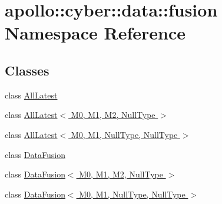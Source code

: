 \hypertarget{namespaceapollo_1_1cyber_1_1data_1_1fusion}{\section{apollo\-:\-:cyber\-:\-:data\-:\-:fusion Namespace Reference}
\label{namespaceapollo_1_1cyber_1_1data_1_1fusion}
}
\subsection*{Classes}
\begin{DoxyCompactItemize}
\item 
class \hyperlink{classapollo_1_1cyber_1_1data_1_1fusion_1_1AllLatest}{All\-Latest}
\item 
class \hyperlink{classapollo_1_1cyber_1_1data_1_1fusion_1_1AllLatest_3_01M0_00_01M1_00_01M2_00_01NullType_01_4}{All\-Latest$<$ M0, M1, M2, Null\-Type $>$}
\item 
class \hyperlink{classapollo_1_1cyber_1_1data_1_1fusion_1_1AllLatest_3_01M0_00_01M1_00_01NullType_00_01NullType_01_4}{All\-Latest$<$ M0, M1, Null\-Type, Null\-Type $>$}
\item 
class \hyperlink{classapollo_1_1cyber_1_1data_1_1fusion_1_1DataFusion}{Data\-Fusion}
\item 
class \hyperlink{classapollo_1_1cyber_1_1data_1_1fusion_1_1DataFusion_3_01M0_00_01M1_00_01M2_00_01NullType_01_4}{Data\-Fusion$<$ M0, M1, M2, Null\-Type $>$}
\item 
class \hyperlink{classapollo_1_1cyber_1_1data_1_1fusion_1_1DataFusion_3_01M0_00_01M1_00_01NullType_00_01NullType_01_4}{Data\-Fusion$<$ M0, M1, Null\-Type, Null\-Type $>$}
\end{DoxyCompactItemize}
